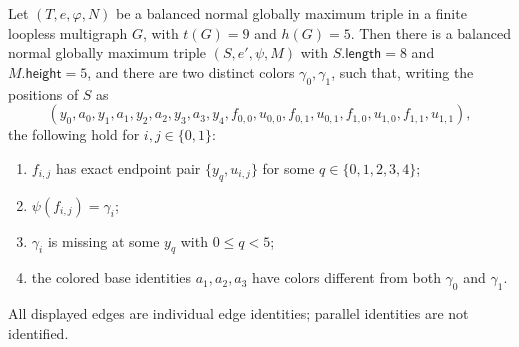 \begin{helper}
Let $(T,e,\varphi,N)$ be a balanced normal globally maximum triple in a
finite loopless multigraph $G$, with $t(G)=9$ and $h(G)=5$.  Then there is
a balanced normal globally maximum triple $(S,e',\psi,M)$ with
$S.\mathsf{length}=8$ and $M.\mathsf{height}=5$, and there are two
distinct colors $\gamma_0,\gamma_1$, such that, writing the positions of
$S$ as
\[
 (y_0,a_0,y_1,a_1,y_2,a_2,y_3,a_3,y_4,
   f_{0,0},u_{0,0},f_{0,1},u_{0,1},
   f_{1,0},u_{1,0},f_{1,1},u_{1,1}),
\]
the following hold for $i,j\in\{0,1\}$:
\begin{enumerate}
\item $f_{i,j}$ has exact endpoint pair $\{y_q,u_{i,j}\}$ for some
      $q\in\{0,1,2,3,4\}$;
\item $\psi(f_{i,j})=\gamma_i$;
\item $\gamma_i$ is missing at some $y_q$ with $0\leq q<5$;
\item the colored base identities $a_1,a_2,a_3$ have colors different
      from both $\gamma_0$ and $\gamma_1$.
\end{enumerate}
All displayed edges are individual edge identities; parallel identities
are not identified.
\end{helper}
